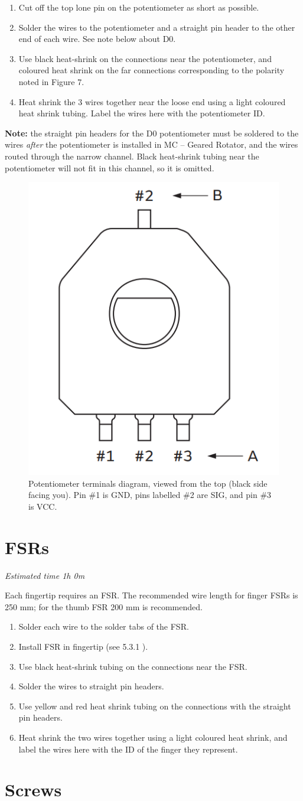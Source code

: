 \begin{enumerate}
\item Cut off the top lone pin on the potentiometer as short as possible.
\item Solder the wires to the potentiometer and a straight pin header to the other end of each wire. See note below about D0.
\item Use black heat-shrink on the connections near the potentiometer, and coloured heat shrink on the far connections corresponding to the polarity noted in Figure 7.
\item Heat shrink the 3 wires together near the loose end using a light coloured heat shrink tubing. Label the wires here with the potentiometer ID.
\end{enumerate}
\textbf{Note:}  the straight pin headers for the D0 potentiometer must be soldered to the wires \textit{after} the potentiometer is installed in MC – Geared Rotator, and the wires routed through the narrow channel. Black heat-shrink tubing near the potentiometer will not fit in this channel, so it is omitted. 
\begin{figure}[H]
\centering
\includegraphics[width=0.3\linewidth]{Figures/Pot_Pins.png}
\caption{Potentiometer terminals diagram, viewed from the top (black side facing you). Pin \#1 is GND, pins labelled \#2 are SIG, and pin \#3 is VCC.}
\label{pot_pins}
\end{figure}


\section{FSRs}
\textit{Estimated time 1h 0m}

Each fingertip requires an FSR. The recommended wire length for finger FSRs is 250 mm; for the thumb FSR 200 mm is recommended. 
\begin{enumerate}
\item Solder each wire to the solder tabs of the FSR. 
\item Install FSR in fingertip (see 5.3.1 ).
\item Use black heat-shrink tubing on the connections near the FSR.
\item Solder the wires to straight pin headers.
\item Use yellow and red heat shrink tubing on the connections with the straight pin headers.
\item Heat shrink the two wires together using a light coloured heat shrink, and label the wires here with the ID of the finger they represent.
\end{enumerate}

\section{Screws}
